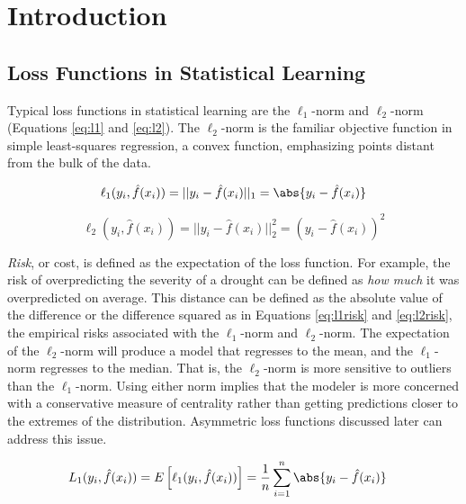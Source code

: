 \section{Introduction}
\subsection{Loss Functions in Statistical Learning}
Typical loss functions in statistical learning are the $\ell_1$-norm and $\ell_2$-norm (Equations \ref{eq:l1} and \ref{eq:l2}). The $\ell_2$-norm is the familiar objective function in simple least-squares regression, a convex function, emphasizing points distant from the bulk of the data. %

\begin{equation} \label{eq:l1}
	\ell_1(y_i,\hat{f}(x_i)) = ||y_i-\hat{f}(x_i)||_1 = \abs{y_i-\hat{f}(x_i)} 
\end{equation}
	
\begin{equation} \label{eq:l2}
	\ell_2(y_i,\hat{f}(x_i)) = ||y_i-\hat{f}(x_i)||_2^2 = \left(y_i-\hat{f}(x_i)\right)^2 
\end{equation}
 
\textit{Risk}, or cost, is defined as the expectation of the loss function. For example, the risk of overpredicting the severity of a drought can be defined as \textit{how much} it was overpredicted on average. This distance can be defined as the absolute value of the difference or the difference squared as in Equations \ref{eq:l1risk} and \ref{eq:l2risk}, the empirical risks associated with the $\ell_1$-norm and $\ell_2$-norm. The expectation of the $\ell_2$-norm will produce a model that regresses to the mean, and the $\ell_1$-norm regresses to the median. That is, the $\ell_2$-norm is more sensitive to outliers than the $\ell_1$-norm. Using either norm implies that the modeler is more concerned with a conservative measure of centrality rather than getting predictions closer to the extremes of the distribution. Asymmetric loss functions discussed later can address this issue. 

\begin{equation} \label{eq:l1risk}
	\begin{aligned}
		& L_1(y_i,\hat{f}(x_i)) = E\left[\ell_1(y_i, \hat{f}(x_i))\right] = \frac{1}{n} \sum_{i=1}^{n} \abs{y_i-\hat{f}(x_i)}
	\end{aligned}
\end{equation}
	
